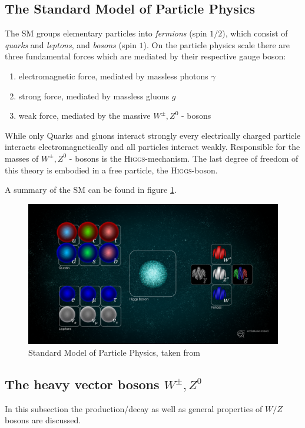 \documentclass[11pt,a4paper,notitlepage]{scrartcl}
\begin{document}
\subsection{The Standard Model of Particle Physics}
The SM groups elementary particles into \emph{fermions} (spin $1/2$), which consist of \emph{quarks} and \emph{leptons}, and \emph{bosons} (spin $1$). On the particle physics scale there are three fundamental forces which are mediated by their respective gauge boson: 
\begin{enumerate}
	\item electromagnetic force, mediated by massless photons $\gamma$
	\item strong force, mediated by massless gluons $g$
	\item weak force, mediated by the massive $W^\pm, Z^0$ - bosons
\end{enumerate}
While only Quarks and gluons interact strongly every electrically charged particle interacts electromagnetically and all particles interact weakly. Responsible for the masses of $W^\pm, Z^0$ - bosons is the \textsc{Higgs}-mechanism. The last degree of freedom of this theory is embodied in a free particle, the \textsc{Higgs}-boson. 

A summary of the SM can be found in figure \ref{fig:sm}. \cite{povh}

\begin{figure}[htbp]
	\centering
	\includegraphics[width=.8\linewidth]{schematics/sm}
	\caption{Standard Model of Particle Physics, taken from \cite{sm}}
	\label{fig:sm}
\end{figure}
\newpage
\subsection{The heavy vector bosons $W^{\pm},Z^0$}
In this subsection the production/decay as well as general properties of $W/Z$ bosons are discussed.
\end{document}
